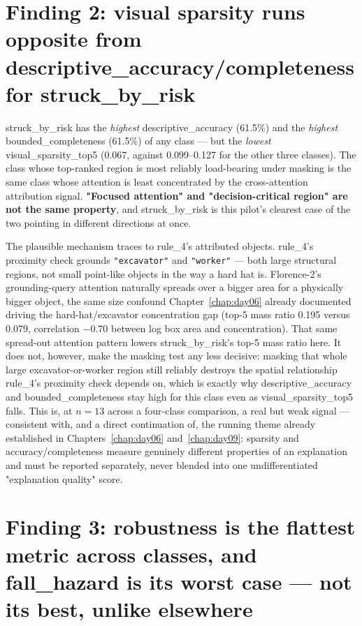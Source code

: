 \section{Finding 2: visual sparsity runs opposite from descriptive\_accuracy/completeness for struck\_by\_risk}

struck\_by\_risk has the \emph{highest} descriptive\_accuracy (61.5\%) and the \emph{highest}
bounded\_completeness (61.5\%) of any class --- but the \emph{lowest} visual\_sparsity\_top5
(0.067, against 0.099--0.127 for the other three classes). The class whose top-ranked region is
most reliably load-bearing under masking is the same class whose attention is least
concentrated by the cross-attention attribution signal. \textbf{"Focused attention" and
"decision-critical region" are not the same property}, and struck\_by\_risk is this pilot's
clearest case of the two pointing in different directions at once.

The plausible mechanism traces to rule\_4's attributed objects. rule\_4's proximity check
grounds \texttt{"excavator"} and \texttt{"worker"} --- both large structural regions, not small
point-like objects in the way a hard hat is. Florence-2's grounding-query attention naturally
spreads over a bigger area for a physically bigger object, the same size confound
Chapter~\ref{chap:day06} already documented driving the hard-hat/excavator concentration gap
(top-5 mass ratio 0.195 versus 0.079, correlation $-0.70$ between log box area and
concentration). That same spread-out attention pattern lowers struck\_by\_risk's top-5 mass
ratio here. It does not, however, make the masking test any less decisive: masking that whole
large excavator-or-worker region still reliably destroys the spatial relationship rule\_4's
proximity check depends on, which is exactly why descriptive\_accuracy and bounded\_completeness
stay high for this class even as visual\_sparsity\_top5 falls. This is, at $n=13$ across a
four-class comparison, a real but weak signal --- consistent with, and a direct continuation of,
the running theme already established in Chapters~\ref{chap:day06} and~\ref{chap:day09}:
sparsity and accuracy/completeness measure genuinely different properties of an explanation and
must be reported separately, never blended into one undifferentiated "explanation quality"
score.

\section{Finding 3: robustness is the flattest metric across classes, and fall\_hazard is its worst case --- not its best, unlike elsewhere}

